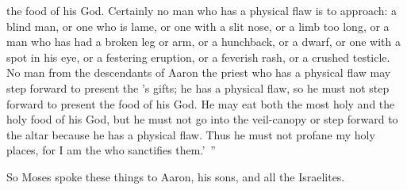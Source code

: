 {the food
of his God.
Certainly
no man
who
has a physical flaw
is to approach: a blind
man,
or
one who is lame,
or
one with a slit
nose, or
a limb too long,
or
a man
who
has had a broken
leg
or
arm,
or
a hunchback,
or
a dwarf,
or
one with a spot
in his eye,
or
a festering eruption,
or
a feverish rash,
or
a crushed
testicle.
No man
from the descendants
of Aaron
the priest
who
has a physical flaw
may step forward
to present
the
{}’s
gifts;
he has a physical flaw,
so
he must not
step forward
to present
the
food
of his God.
He may eat
both the most holy
and the holy
food
of his God,
but
he must not
go
into the veil-canopy
or
step forward
to
the altar
because
he has a physical flaw.
Thus he must not
profane
my holy places,
for
I am
the {}
who sanctifies them.’ ”
\par }{\PP {}So Moses
spoke
these things to
Aaron,
his sons,
and all
the Israelites.

}
